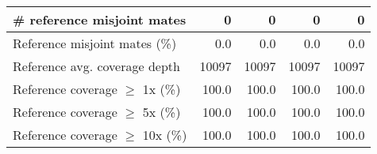 \documentclass[12pt,a4paper]{article}
\begin{document}
\begin{table}[ht]
\begin{center}
\begin{tabular}{|l*{4}{|r}|}
\# reference misjoint mates & 0 & 0 & 0 & 0 \\ \hline
Reference misjoint mates (\%) & 0.0 & 0.0 & 0.0 & 0.0 \\ \hline
Reference avg. coverage depth & 10097 & 10097 & 10097 & 10097 \\ \hline
Reference coverage $\geq$ 1x (\%) & 100.0 & 100.0 & 100.0 & 100.0 \\ \hline
Reference coverage $\geq$ 5x (\%) & 100.0 & 100.0 & 100.0 & 100.0 \\ \hline
Reference coverage $\geq$ 10x (\%) & 100.0 & 100.0 & 100.0 & 100.0 \\ \hline
\end{tabular}
\end{center}
\end{table}
\end{document}
